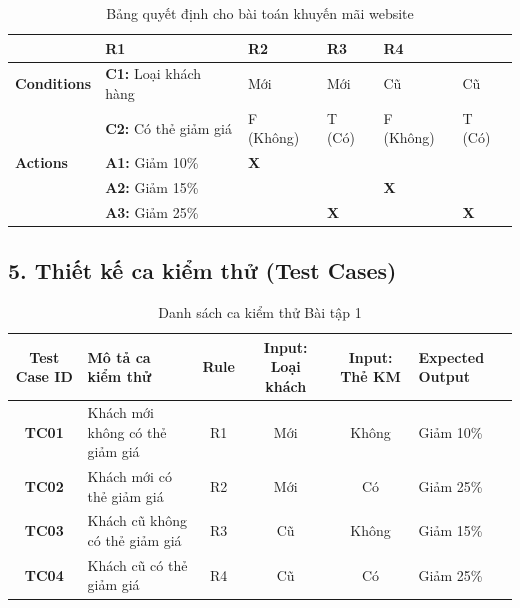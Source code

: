 \documentclass[11pt,a4paper]{article}
\begin{document}
\begin{table}[H]
\centering
\renewcommand{\arraystretch}{1.2}
\begin{tabularx}{\textwidth}{|l|l|Y|Y|Y|Y|}
\hline
{}
 & \textbf{R1} & \textbf{R2} & \textbf{R3} & \textbf{R4} \\ \hline
\textbf{Conditions} & \textbf{C1:} Loại khách hàng & Mới & Mới & Cũ & Cũ \\ 
 & \textbf{C2:} Có thẻ giảm giá & F (Không) & T (Có) & F (Không) & T (Có) \\ \hline
\textbf{Actions} & \textbf{A1:} Giảm 10\% & \textbf{X} & & & \\ 
 & \textbf{A2:} Giảm 15\% & & & \textbf{X} & \\ 
 & \textbf{A3:} Giảm 25\% & & \textbf{X} & & \textbf{X} \\ \hline
\end{tabularx}
\caption*{Bảng quyết định cho bài toán khuyến mãi website}
\end{table}

\subsection*{5. Thiết kế ca kiểm thử (Test Cases)}

\begin{table}[H]
\centering
\renewcommand{\arraystretch}{1.2}
\begin{tabularx}{\textwidth}{|c|L|c|c|c|L|}
\hline
{}
\textbf{Test Case ID} & \textbf{Mô tả ca kiểm thử} & \textbf{Rule} & \textbf{Input: Loại khách} & \textbf{Input: Thẻ KM} & \textbf{Expected Output} \\ \hline
\textbf{TC01} & Khách mới không có thẻ giảm giá & R1 & Mới & Không & Giảm 10\% \\ \hline
\textbf{TC02} & Khách mới có thẻ giảm giá & R2 & Mới & Có & Giảm 25\% \\ \hline
\textbf{TC03} & Khách cũ không có thẻ giảm giá & R3 & Cũ & Không & Giảm 15\% \\ \hline
\textbf{TC04} & Khách cũ có thẻ giảm giá & R4 & Cũ & Có & Giảm 25\% \\ \hline
\end{tabularx}
\caption*{Danh sách ca kiểm thử Bài tập 1}
\end{table}

\newpage

\end{document}

